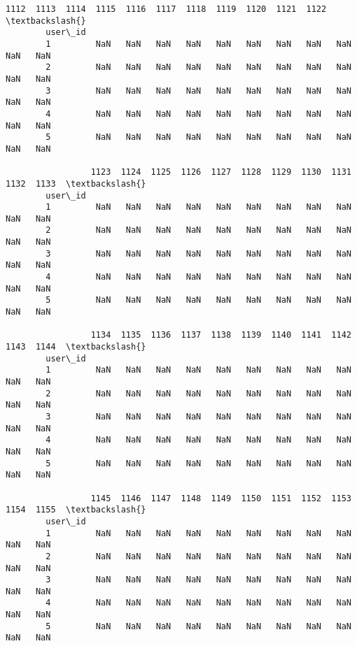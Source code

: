 \documentclass[11pt]{article}
\begin{document}
\begin{Verbatim}[commandchars=\\\{\}]
                 1112  1113  1114  1115  1116  1117  1118  1119  1120  1121  1122  \textbackslash{}
        user\_id                                                                     
        1         NaN   NaN   NaN   NaN   NaN   NaN   NaN   NaN   NaN   NaN   NaN   
        2         NaN   NaN   NaN   NaN   NaN   NaN   NaN   NaN   NaN   NaN   NaN   
        3         NaN   NaN   NaN   NaN   NaN   NaN   NaN   NaN   NaN   NaN   NaN   
        4         NaN   NaN   NaN   NaN   NaN   NaN   NaN   NaN   NaN   NaN   NaN   
        5         NaN   NaN   NaN   NaN   NaN   NaN   NaN   NaN   NaN   NaN   NaN   
        
                 1123  1124  1125  1126  1127  1128  1129  1130  1131  1132  1133  \textbackslash{}
        user\_id                                                                     
        1         NaN   NaN   NaN   NaN   NaN   NaN   NaN   NaN   NaN   NaN   NaN   
        2         NaN   NaN   NaN   NaN   NaN   NaN   NaN   NaN   NaN   NaN   NaN   
        3         NaN   NaN   NaN   NaN   NaN   NaN   NaN   NaN   NaN   NaN   NaN   
        4         NaN   NaN   NaN   NaN   NaN   NaN   NaN   NaN   NaN   NaN   NaN   
        5         NaN   NaN   NaN   NaN   NaN   NaN   NaN   NaN   NaN   NaN   NaN   
        
                 1134  1135  1136  1137  1138  1139  1140  1141  1142  1143  1144  \textbackslash{}
        user\_id                                                                     
        1         NaN   NaN   NaN   NaN   NaN   NaN   NaN   NaN   NaN   NaN   NaN   
        2         NaN   NaN   NaN   NaN   NaN   NaN   NaN   NaN   NaN   NaN   NaN   
        3         NaN   NaN   NaN   NaN   NaN   NaN   NaN   NaN   NaN   NaN   NaN   
        4         NaN   NaN   NaN   NaN   NaN   NaN   NaN   NaN   NaN   NaN   NaN   
        5         NaN   NaN   NaN   NaN   NaN   NaN   NaN   NaN   NaN   NaN   NaN   
        
                 1145  1146  1147  1148  1149  1150  1151  1152  1153  1154  1155  \textbackslash{}
        user\_id                                                                     
        1         NaN   NaN   NaN   NaN   NaN   NaN   NaN   NaN   NaN   NaN   NaN   
        2         NaN   NaN   NaN   NaN   NaN   NaN   NaN   NaN   NaN   NaN   NaN   
        3         NaN   NaN   NaN   NaN   NaN   NaN   NaN   NaN   NaN   NaN   NaN   
        4         NaN   NaN   NaN   NaN   NaN   NaN   NaN   NaN   NaN   NaN   NaN   
        5         NaN   NaN   NaN   NaN   NaN   NaN   NaN   NaN   NaN   NaN   NaN   
        

\end{Verbatim}
\end{document}
